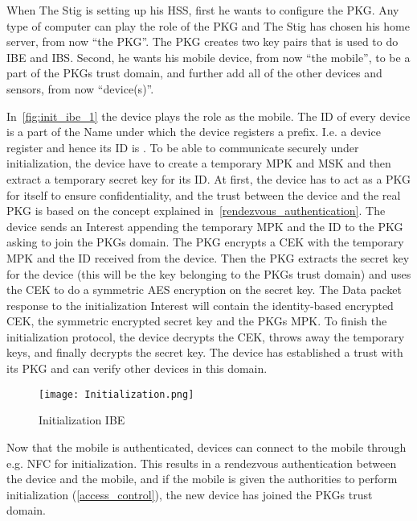 When The Stig is setting up his \gls{HSS}, first he wants to configure the \gls{PKG}. 
Any type of computer can play the role of the \gls{PKG} and The Stig has chosen his home server, from now ``the PKG''.
The \gls{PKG} creates two key pairs that is used to do \gls{IBE} and \gls{IBS}.
Second, he wants his mobile device, from now ``the mobile'', to be a part of the \gls{PKG}s trust domain, and further add all of the other devices and sensors, from now ``device(s)''.

In~\autoref{fig:init_ibe_1} the device plays the role as the mobile. 
The \gls{ID} of every device is a part of the Name under which the device registers a prefix.
I.e. a device register  and hence its \gls{ID} is .
To be able to communicate securely under initialization, the device have to create a temporary \gls{MPK} and \gls{MSK} and then extract a temporary secret key for its \gls{ID}. 
At first, the device has to act as a \gls{PKG} for itself to ensure confidentiality, and the trust between the device and the real \gls{PKG} is based on the concept explained in~\autoref{rendezvous_authentication}.
The device sends an Interest appending the temporary \gls{MPK} and the \gls{ID} to the \gls{PKG} asking to join the \gls{PKG}s domain.
The \gls{PKG} encrypts a \gls{CEK} with the temporary \gls{MPK} and the \gls{ID} received from the device. 
Then the \gls{PKG} extracts the secret key for the device (this will be the key belonging to the \gls{PKG}s trust domain) and uses the \gls{CEK} to do a symmetric \gls{AES} encryption on the secret key. 
The Data packet response to the initialization Interest will contain the identity-based encrypted \gls{CEK}, the symmetric encrypted secret key and the \gls{PKG}s \gls{MPK}.
To finish the initialization protocol, the device decrypts the \gls{CEK}, throws away the temporary keys, and finally decrypts the secret key.
The device has established a trust with its \gls{PKG} and can verify other devices in this domain. 

\begin{figure}[ht]
  \centering
  \texttt{[image: Initialization.png]}
  \caption{Initialization IBE}
  \label{fig:init_ibe_1}
\end{figure}

Now that the mobile is authenticated, devices can connect to the mobile through e.g. \gls{NFC} for initialization.
This results in a rendezvous authentication between the device and the mobile, and if the mobile is given the authorities to perform initialization (\autoref{access_control}), the new device has joined the \gls{PKG}s trust domain.

